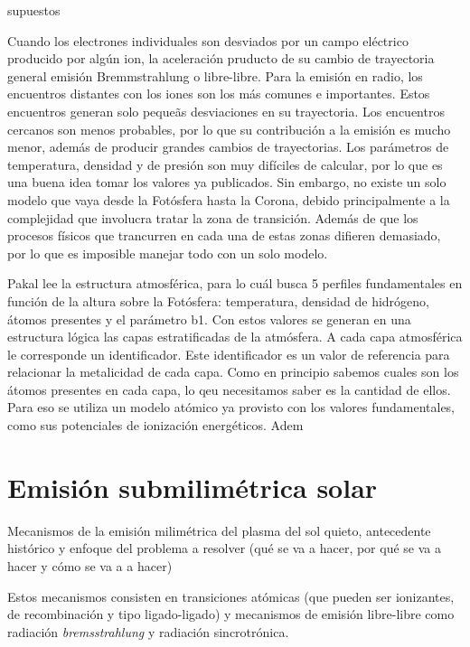 \documentclass[9pt]{book}
\begin{document}
supuestos

Cuando los electrones individuales son desviados por un campo el\'ectrico producido por alg\'un ion, la aceleraci\'on pruducto de su cambio de trayectoria general emisi\'on Bremmstrahlung o libre-libre.  Para la emisi\'on en radio, los encuentros distantes con los iones son los m\'as comunes e importantes. Estos encuentros generan solo peque\~as desviaciones en su trayectoria. Los encuentros cercanos son menos probables, por lo que su contribuci\'on a la emisi\'on es mucho menor, adem\'as de producir grandes cambios de trayectorias.
Los par\'ametros de temperatura, densidad y de presi\'on son muy dif\'iciles de calcular, por lo que es una buena idea tomar los valores ya publicados. Sin embargo, no existe un solo modelo que vaya desde la Fot\'osfera hasta la Corona, debido principalmente a la complejidad que involucra tratar la zona de transici\'on. Adem\'as de que los procesos f\'isicos que trancurren en cada una de estas zonas difieren demasiado, por lo que es imposible manejar todo con un solo modelo.


Pakal lee la estructura atmosf\'erica, para lo cu\'al busca 5 perfiles fundamentales en funci\'on de la altura sobre la Fot\'osfera: temperatura, densidad de hidr\'ogeno, \'atomos presentes y el par\'ametro b1. Con estos valores se generan en una estructura l\'ogica las capas estratificadas de la atm\'osfera. A cada capa atmosf\'erica le corresponde un identificador. Este identificador es un valor de referencia para relacionar la metalicidad de cada capa. Como en principio sabemos cuales son los \'atomos presentes en cada capa, lo qeu necesitamos saber es la cantidad de ellos. Para eso se utiliza un modelo at\'omico ya provisto con los valores fundamentales, como sus potenciales de ionizaci\'on energ\'eticos. Adem





\chapter{Emisi\'on submilim\'etrica solar}
Mecanismos de la emisi\'on milim\'etrica del plasma del sol quieto, antecedente hist\'orico y enfoque del problema a resolver (qu\'e se va a hacer, por qu\'e se va a hacer y c\'omo se va a a hacer)

Estos mecanismos consisten en transiciones at\'omicas (que pueden ser ionizantes, de recombinaci\'on y tipo ligado-ligado) y mecanismos de emisi\'on libre-libre como radiaci\'on \emph{bremsstrahlung} y radiaci\'on sincrotr\'onica.
\end{document}
